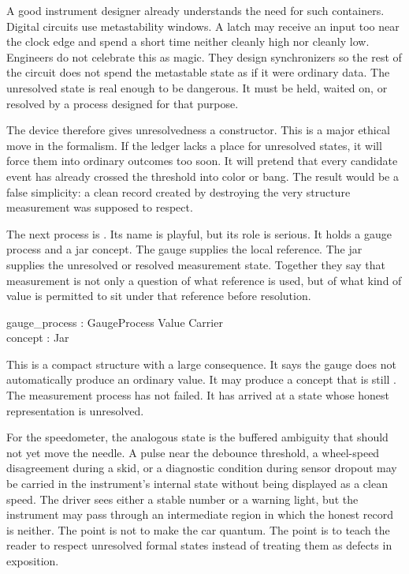 A good instrument designer already understands the need for such containers.
Digital circuits use metastability windows. A latch may receive an input too
near the clock edge and spend a short time neither cleanly high nor cleanly
low. Engineers do not celebrate this as magic. They design synchronizers so the
rest of the circuit does not spend the metastable state as if it were ordinary
data. The unresolved state is real enough to be dangerous. It must be held,
waited on, or resolved by a process designed for that purpose.

The device therefore gives unresolvedness a constructor. This is a major
ethical move in the formalism. If the ledger lacks a place for unresolved
states, it will force them into ordinary outcomes too soon. It will pretend
that every candidate event has already crossed the threshold into color or
bang. The result would be a false simplicity: a clean record created by
destroying the very structure measurement was supposed to respect.

The next process is . Its name is playful, but its role is
serious. It holds a gauge process and a jar concept. The gauge supplies the
local reference. The jar supplies the unresolved or resolved measurement state.
Together they say that measurement is not only a question of what reference is
used, but of what kind of value is permitted to sit under that reference before
resolution.

\begin{leancode}
gauge\_process : GaugeProcess Value Carrier\\
concept : Jar
\end{leancode}

This is a compact structure with a large consequence. It says the gauge does
not automatically produce an ordinary value. It may produce a concept that is
still . The measurement process has not failed. It has
arrived at a state whose honest representation is unresolved.

For the speedometer, the analogous state is the buffered ambiguity that should
not yet move the needle. A pulse near the debounce threshold, a wheel-speed
disagreement during a skid, or a diagnostic condition during sensor dropout may
be carried in the instrument's internal state without being displayed as a
clean speed. The driver sees either a stable number or a warning light, but the
instrument may pass through an intermediate region in which the honest record
is neither. The point is not to make the car quantum. The point is to teach the
reader to respect unresolved formal states instead of treating them as defects
in exposition.

